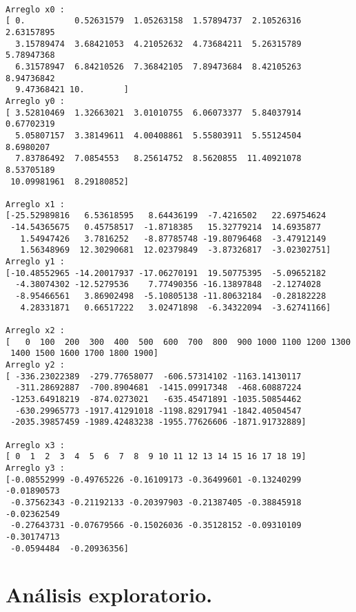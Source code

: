 \documentclass[
  letterpaper,
  DIV=11,
  numbers=noendperiod]{scrreprt}
\begin{document}
\begin{verbatim}

Arreglo x0 :
[ 0.          0.52631579  1.05263158  1.57894737  2.10526316  2.63157895
  3.15789474  3.68421053  4.21052632  4.73684211  5.26315789  5.78947368
  6.31578947  6.84210526  7.36842105  7.89473684  8.42105263  8.94736842
  9.47368421 10.        ]
Arreglo y0 :
[ 3.52810469  1.32663021  3.01010755  6.06073377  5.84037914  0.67702319
  5.05807157  3.38149611  4.00408861  5.55803911  5.55124504  8.6980207
  7.83786492  7.0854553   8.25614752  8.5620855  11.40921078  8.53705189
 10.09981961  8.29180852]

Arreglo x1 :
[-25.52989816   6.53618595   8.64436199  -7.4216502   22.69754624
 -14.54365675   0.45758517  -1.8718385   15.32779214  14.6935877
   1.54947426   3.7816252   -8.87785748 -19.80796468  -3.47912149
   1.56348969  12.30290681  12.02379849  -3.87326817  -3.02302751]
Arreglo y1 :
[-10.48552965 -14.20017937 -17.06270191  19.50775395  -5.09652182
  -4.38074302 -12.5279536    7.77490356 -16.13897848  -2.1274028
  -8.95466561   3.86902498  -5.10805138 -11.80632184  -0.28182228
   4.28331871   0.66517222   3.02471898  -6.34322094  -3.62741166]

Arreglo x2 :
[   0  100  200  300  400  500  600  700  800  900 1000 1100 1200 1300
 1400 1500 1600 1700 1800 1900]
Arreglo y2 :
[ -336.23022389  -279.77658077  -606.57314102 -1163.14130117
  -311.28692887  -700.8904681  -1415.09917348  -468.60887224
 -1253.64918219  -874.0273021   -635.45471891 -1035.50854462
  -630.29965773 -1917.41291018 -1198.82917941 -1842.40504547
 -2035.39857459 -1989.42483238 -1955.77626606 -1871.91732889]

Arreglo x3 :
[ 0  1  2  3  4  5  6  7  8  9 10 11 12 13 14 15 16 17 18 19]
Arreglo y3 :
[-0.08552999 -0.49765226 -0.16109173 -0.36499601 -0.13240299 -0.01890573
 -0.37562343 -0.21192133 -0.20397903 -0.21387405 -0.38845918 -0.02362549
 -0.27643731 -0.07679566 -0.15026036 -0.35128152 -0.09310109 -0.30174713
 -0.0594484  -0.20936356]
\end{verbatim}


\chapter{Análisis exploratorio.}\label{anuxe1lisis-exploratorio.}
\end{document}

